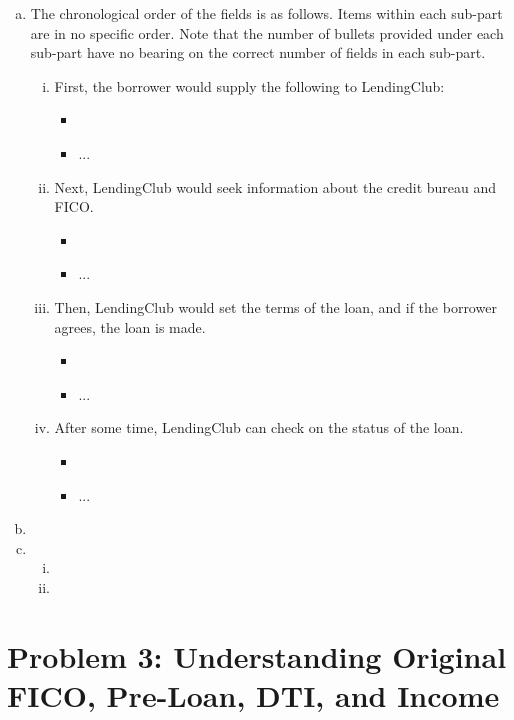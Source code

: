 \documentclass{article}
\begin{document}
\begin{enumerate}[(a)]
   \item The chronological order of the fields is as follows. Items within each sub-part are in no specific order. Note that the number of bullets provided under each sub-part have no bearing on the correct number of fields in each sub-part. \par
   \begin{enumerate}[(i)]
       \item First, the borrower would supply the following to LendingClub:
       \begin{itemize}
           \item 
           \item ...
       \end{itemize}
       \item Next, LendingClub would seek information about the credit bureau and FICO. 
       \begin{itemize}
           \item 
           \item ...
       \end{itemize}
       \item Then, LendingClub would set the terms of the loan, and if the borrower agrees, the loan is made.  
       \begin{itemize}
           \item 
           \item ...
       \end{itemize}
       \item After some time, LendingClub can check on the status of the loan. 
       \begin{itemize}
           \item 
           \item ...
       \end{itemize}
   \end{enumerate}
   \item 
   \item 
   \begin{enumerate}[(i)]
       \item 
       \item 
   \end{enumerate}
 \end{enumerate}
 

 
\newpage
\section*{Problem 3: Understanding Original FICO, Pre-Loan, DTI, and Income}
\end{document}
